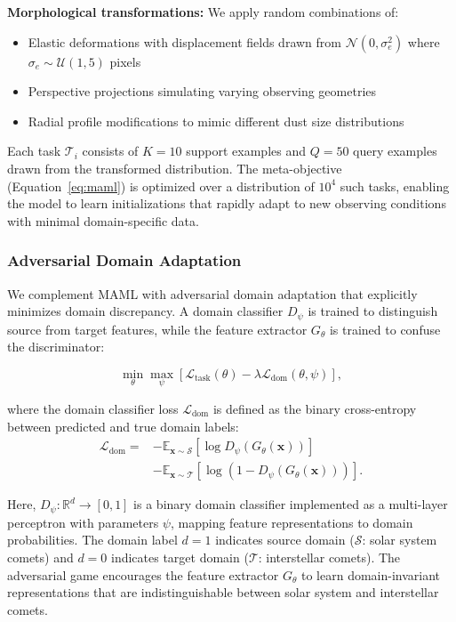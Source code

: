 \documentclass[preprint2]{aastex631}
\begin{document}
\textbf{Morphological transformations:} We apply random combinations of:
\begin{itemize}
    \item Elastic deformations with displacement fields drawn from $\mathcal{N}(0, \sigma_e^2)$ where $\sigma_e \sim \mathcal{U}(1, 5)$ pixels
    \item Perspective projections simulating varying observing geometries
    \item Radial profile modifications to mimic different dust size distributions
\end{itemize}

Each task $\mathcal{T}_i$ consists of $K=10$ support examples and $Q=50$ query examples drawn from the transformed distribution. The meta-objective (Equation~\ref{eq:maml}) is optimized over a distribution of $10^4$ such tasks, enabling the model to learn initializations that rapidly adapt to new observing conditions with minimal domain-specific data.

\subsubsection{Adversarial Domain Adaptation}

We complement MAML with adversarial domain adaptation \citep{ganin16} that explicitly minimizes domain discrepancy. A domain classifier $D_\psi$ is trained to distinguish source from target features, while the feature extractor $G_\theta$ is trained to confuse the discriminator:

\begin{equation}\label{eq:adv_loss}
\min_\theta \max_\psi \left[ \mathcal{L}_{\text{task}}(\theta) - \lambda \mathcal{L}_{\text{dom}}(\theta, \psi) \right],
\end{equation}

where the domain classifier loss $\mathcal{L}_{\text{dom}}$ is defined as the binary cross-entropy between predicted and true domain labels:
\begin{equation}\label{eq:dom_loss}
\begin{split}
\mathcal{L}_{\text{dom}} ={} &
    -\mathbb{E}_{\mathbf{x} \sim \mathcal{S}}[\log D_\psi(G_\theta(\mathbf{x}))] \\
    &-\mathbb{E}_{\mathbf{x} \sim \mathcal{T}}[\log(1 - D_\psi(G_\theta(\mathbf{x})))].
\end{split}
\end{equation}

Here, $D_\psi: \mathbb{R}^d \rightarrow [0,1]$ is a binary domain classifier implemented as a multi-layer perceptron with parameters $\psi$, mapping feature representations to domain probabilities. The domain label $d=1$ indicates source domain ($\mathcal{S}$: solar system comets) and $d=0$ indicates target domain ($\mathcal{T}$: interstellar comets). The adversarial game encourages the feature extractor $G_\theta$ to learn domain-invariant representations that are indistinguishable between solar system and interstellar comets.
\end{document}
